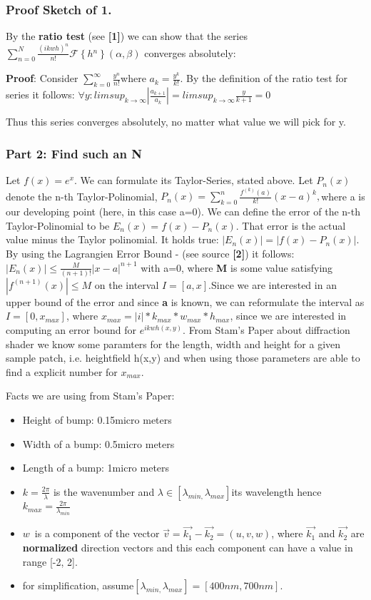 \subsubsection{Proof Sketch of 1.}

By the \textbf{ratio test} (see \textbf{{[}1{]}}) we can show that
the series $\sum_{n=0}^{N}\frac{(ikwh)^{n}}{n!}\mathcal{F}\left\{ h{}^{n}\right\} (\alpha,\beta)$
converges absolutely:

\textbf{Proof}: Consider $\sum_{k=0}^{\infty}\frac{y^{n}}{n!}$where
$a_{k}=\frac{y^{k}}{k!}$. By the definition of the ratio test for
series it follows: $\forall y:$$limsup_{k\rightarrow\infty}|\frac{a_{k+1}}{a_{k}}|=limsup_{k\rightarrow\infty}\frac{y}{k+1}=0$ 

Thus this series converges absolutely, no matter what value we will
pick for y.


\subsubsection{Part 2: Find such an N}

Let $f(x)=e^{x}$. We can formulate its Taylor-Series, stated above.
Let $P_{n}(x)$denote the n-th Taylor-Polinomial, $P_{n}(x)=\sum_{k=0}^{n}\frac{f^{(k)}(a)}{k!}(x-a)^{k},$where
a is our developing point (here, in this case a=0). We can define
the error of the n-th Taylor-Polinomial to be $E_{n}(x)=f(x)-P_{n}(x)$.
That error is the actual value minus the Taylor polinomial. It holds
true: $|E_{n}(x)|=|f(x)-P_{n}(x)|$. By using the Lagrangien Error
Bound - (see source \textbf{{[}2{]}}) it follows: $|E_{n}(x)|\leq\frac{M}{(n+1)!}|x-a|^{n+1}$
with a=0, where \textbf{M }is some value satisfying $|f^{(n+1)}(x)|\leq M$
on the interval $I=[a,x]$.Since we are interested in an upper bound
of the error and since \textbf{a} is known, we can reformulate the
interval as $I=[0,x_{max}]$, where $x_{max}=|i|*k_{max}*w_{max}*h_{max}$,
since we are interested in computing an error bound for $e^{ikwh(x,y)}$.
From Stam's Paper about diffraction shader we know some paramters
for the length, width and height for a given sample patch, i.e. heightfield
h(x,y) and when using those parameters are able to find a explicit
number for $x_{max}$.

Facts we are using from Stam's Paper:

\begin{itemize}
\item Height of bump: 0.15micro meters
\item Width of a bump: 0.5micro meters
\item Length of a bump: 1micro meters
\item $k=\frac{2\pi}{\lambda}$ is the wavenumber and $\lambda\in[\lambda_{min,}\lambda_{max}]$its
wavelength hence $k_{max}=\frac{2\pi}{\lambda_{min}}$ 
\item $w$~is a component of the vector $\vec{v}=\vec{k_{1}}-\vec{k_{2}}=(u,v,w)$,
where $\vec{k_{1}}$ and $\vec{k_{2}}$ are \textbf{normalized} direction
vectors and this each component can have a value in range {[}-2, 2{]}.
\item for simplification, assume$[\lambda_{min,}\lambda_{max}]=[400nm,700nm].$
\end{itemize}

